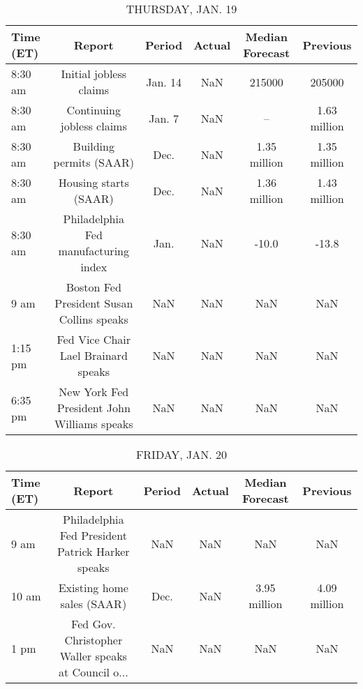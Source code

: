 \documentclass{article}%
\begin{document}
\begin{table}[htbp]%
\caption{THURSDAY, JAN. 19}%
\centering%
\begin{adjustbox}{width=1\textwidth}%
\begin{tabular}{lccccc}
\toprule
Time (ET) &                                      Report &  Period & Actual & Median Forecast &     Previous \\
\midrule
  8:30 am &                      Initial jobless claims & Jan. 14 &    NaN &          215000 &       205000 \\
  8:30 am &                   Continuing jobless claims &  Jan. 7 &    NaN &              -- & 1.63 million \\
  8:30 am &                     Building permits (SAAR) &    Dec. &    NaN &    1.35 million & 1.35 million \\
  8:30 am &                       Housing starts (SAAR) &    Dec. &    NaN &    1.36 million & 1.43 million \\
  8:30 am &        Philadelphia Fed manufacturing index &    Jan. &    NaN &           -10.0 &        -13.8 \\
     9 am &   Boston Fed President Susan Collins speaks &     NaN &    NaN &             NaN &          NaN \\
  1:15 pm &         Fed Vice Chair Lael Brainard speaks &     NaN &    NaN &             NaN &          NaN \\
  6:35 pm & New York Fed President John Williams speaks &     NaN &    NaN &             NaN &          NaN \\
\bottomrule
\end{tabular}
%
\end{adjustbox}%
\end{table}

%


\begin{table}[htbp]%
\caption{FRIDAY, JAN. 20}%
\centering%
\begin{adjustbox}{width=1\textwidth}%
\begin{tabular}{lccccc}
\toprule
Time (ET) &                                             Report & Period & Actual & Median Forecast &     Previous \\
\midrule
     9 am &   Philadelphia Fed President Patrick Harker speaks &    NaN &    NaN &             NaN &          NaN \\
    10 am &                         Existing home sales (SAAR) &   Dec. &    NaN &    3.95 million & 4.09 million \\
     1 pm & Fed Gov. Christopher Waller speaks at Council o... &    NaN &    NaN &             NaN &          NaN \\
\bottomrule
\end{tabular}
%
\end{adjustbox}%
\end{table}
\end{document}
